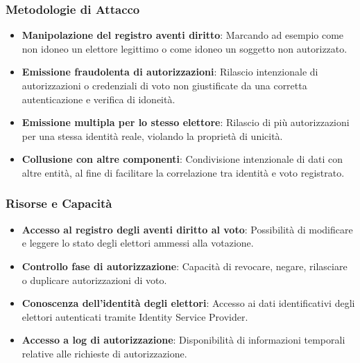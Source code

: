 \documentclass[a4paper,12pt]{article}
\begin{document}
\subsubsection*{Metodologie di Attacco}

\begin{itemize}
    \item \textbf{Manipolazione del registro aventi diritto}: Marcando ad esempio come non idoneo un elettore legittimo o come idoneo un soggetto non autorizzato.

    \item \textbf{Emissione fraudolenta di autorizzazioni}: Rilascio intenzionale di autorizzazioni o credenziali di voto non giustificate da una corretta autenticazione e verifica di idoneità.

    \item \textbf{Emissione multipla per lo stesso elettore}: Rilascio di più autorizzazioni per una stessa identità reale, violando la proprietà di unicità.

    \item \textbf{Collusione con altre componenti}: Condivisione intenzionale di dati con altre entità, al fine di facilitare la correlazione tra identità e voto registrato.
\end{itemize}

\subsubsection*{Risorse e Capacità}

\begin{itemize}
    \item \textbf{Accesso al registro degli aventi diritto al voto}: Possibilità di modificare e leggere lo stato degli elettori ammessi alla votazione.

    \item \textbf{Controllo fase di autorizzazione}: Capacità di revocare, negare, rilasciare o duplicare autorizzazioni di voto.

    \item \textbf{Conoscenza dell'identità degli elettori}: Accesso ai dati identificativi degli elettori autenticati tramite Identity Service Provider.

    \item \textbf{Accesso a log di autorizzazione}: Disponibilità di informazioni temporali relative alle richieste di autorizzazione.
\end{itemize}
\end{document}
